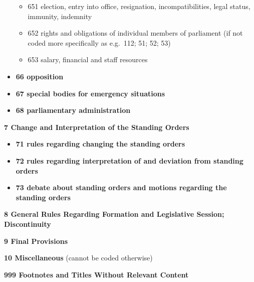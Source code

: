 \documentclass[10pt,]{article}
\providecommand{\tightlist}{%
  \setlength{\itemsep}{0pt}\setlength{\parskip}{0pt}}
\begin{document}
\begin{itemize}
  \begin{itemize}
  \tightlist
  \item
    651 election, entry into office, resignation, incompatibilities,
    legal status, immunity, indemnity
  \item
    652 rights and obligations of individual members of parliament (if
    not coded more specifically as e.g.~112; 51; 52; 53)
  \item
    653 salary, financial and staff resources
  \end{itemize}
\item
  \textbf{66 opposition}
\item
  \textbf{67 special bodies for emergency situations}
\item
  \textbf{68 parliamentary administration}
\end{itemize}

\textbf{7 Change and Interpretation of the Standing Orders}

\begin{itemize}
\tightlist
\item
  \textbf{71 rules regarding changing the standing orders}
\item
  \textbf{72 rules regarding interpretation of and deviation from
  standing orders}
\item
  \textbf{73 debate about standing orders and motions regarding the
  standing orders}
\end{itemize}

\textbf{8 General Rules Regarding Formation and Legislative Session;
Discontinuity}

\textbf{9 Final Provisions}

\textbf{10 Miscellaneous} (cannot be coded otherwise)

\textbf{999 Footnotes and Titles Without Relevant Content}
\end{document}
